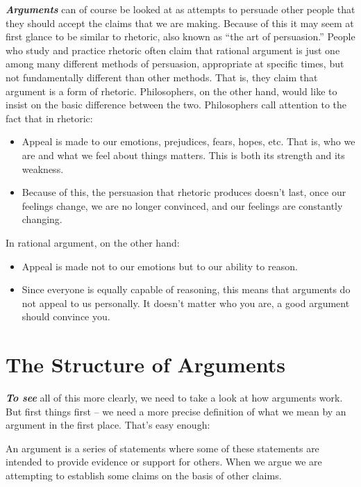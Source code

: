 \documentclass[12pt, openany]{book}
\makeatletter
\newenvironment{kframe}{%
\medskip{}
\setlength{\fboxsep}{.8em}
 \def\at@end@of@kframe{}%
 \ifinner\ifhmode%
  \def\at@end@of@kframe{\end{minipage}}%
  \begin{minipage}{\columnwidth}%
 \fi\fi%
 \def\FrameCommand##1{\hskip\@totalleftmargin \hskip-\fboxsep
 \colorbox{shadecolor}{##1}\hskip-\fboxsep
     \hskip-\linewidth \hskip-\@totalleftmargin \hskip\columnwidth}%
 \MakeFramed {\advance\hsize-\width
   \@totalleftmargin\z@ \linewidth\hsize
   \@setminipage}}%
 {\par\unskip\endMakeFramed%
 \at@end@of@kframe}
\newenvironment{rmdblock}[1]
  {
  \begin{itemize}
  \renewcommand{\labelitemi}{
    \raisebox{-.7\height}[0pt][0pt]{
      {\setkeys{Gin}{width=3em,keepaspectratio}\texttt{[image: img/\#1]}}
    }
  }
  \setlength{\fboxsep}{1em}
  \begin{kframe}
  \item
  }
  {
  \end{kframe}
  \end{itemize}
  }
\newenvironment{note}
  {\begin{rmdblock}{note}}
  {\end{rmdblock}}
\makeatother
\begin{document}
\textbf{\emph{Arguments}} can of course be looked at as attempts to persuade other people that they should accept the claims that we are making. Because of this it may seem at first glance to be similar to rhetoric, also known as ``the art of persuasion.'' People who study and practice rhetoric often claim that rational argument is just one among many different methods of persuasion, appropriate at specific times, but not fundamentally different than other methods. That is, they claim that argument is a form of rhetoric. Philosophers, on the other hand, would like to insist on the basic difference between the two. Philosophers call attention to the fact that in rhetoric:

\begin{itemize}
\item
  Appeal is made to our emotions, prejudices, fears, hopes, etc. That is, who we are and what we feel about things matters. This is both its strength and its weakness.
\item
  Because of this, the persuasion that rhetoric produces doesn't last, once our feelings change, we are no longer convinced, and our feelings are constantly changing.
\end{itemize}

In rational argument, on the other hand:

\begin{itemize}
\item
  Appeal is made not to our emotions but to our ability to reason.
\item
  Since everyone is equally capable of reasoning, this means that arguments do not appeal to us personally. It doesn't matter who you are, a good argument should convince you.
\end{itemize}

\hypertarget{the-structure-of-arguments}{%
\section{The Structure of Arguments}\label{the-structure-of-arguments}}

\textbf{\emph{To see}} all of this more clearly, we need to take a look at how arguments work. But first things first -- we need a more precise definition of what we mean by an argument in the first place. That's easy enough:

\begin{note}

An argument is a series of statements where some of these statements are intended to provide evidence or support for others. When we argue we are attempting to establish some claims on the basis of other claims.

\end{note}
\end{document}
